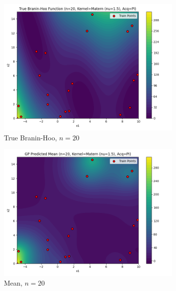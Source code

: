 \documentclass[a4paper,12pt]{article}
\begin{document}
\begin{figure}[H]
\begin{subfigure}{0.3\textwidth}
  \includegraphics[width=\linewidth]{Task-02/images/true_function_matern_n20_PI.png}
  \caption{True Branin-Hoo, $n=20$}
\end{subfigure}
\begin{subfigure}{0.3\textwidth}
    \includegraphics[width=\linewidth]{Task-02/images/gp_mean_matern_n20_PI.png}
    \caption{Mean, $n=20$}
\end{subfigure}
\begin{subfigure}{0.3\textwidth}

\end{subfigure}
\end{figure}
\end{document}
